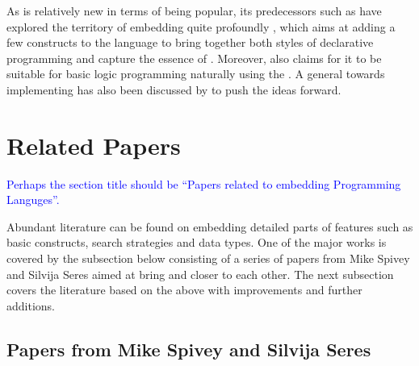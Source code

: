 \documentclass[thesis-solanki.tex]{subfiles}
\begin{document}
As  is relatively new in terms of being popular, its predecessors such as
 have
explored the territory of embedding  quite profoundly \cite{friedman05reasoned}, which aims at adding a few
constructs to the language to bring together both styles of declarative programming and capture the essence of
.
Moreover,  also claims for it to be suitable for basic logic programming naturally using the  \cite{website:logicprogexamplehaskell}.
A general  towards implementing  has also been discussed by
\cite{krishnamurthi2007programming} to push the ideas forward.

\section{Related Papers}
\textcolor{blue}{Perhaps the section title should be ``Papers related to embedding Programming Languges''.}

Abundant literature
can be found on embedding detailed parts of  features
such as basic constructs, search strategies and data types.
One of the major works is covered by the subsection below consisting of a series of papers from Mike Spivey and
Silvija Seres aimed at bring  and  closer to each other.
The next subsection covers the literature based on the above
with improvements and further additions.


\subsection{Papers from Mike Spivey and Silvija Seres}
\end{document}
